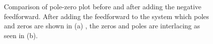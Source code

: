 \begin{figure}[h!]
  \centering %
  \qquad
  \caption{\label{fig:negfeedpzmap} Comparison of pole-zero plot before and after adding the negative feedforward. After adding the feedforward to the system which poles and zeros are shown in (a) , the zeros and poles are interlacing as seen in (b).}
\end{figure}

